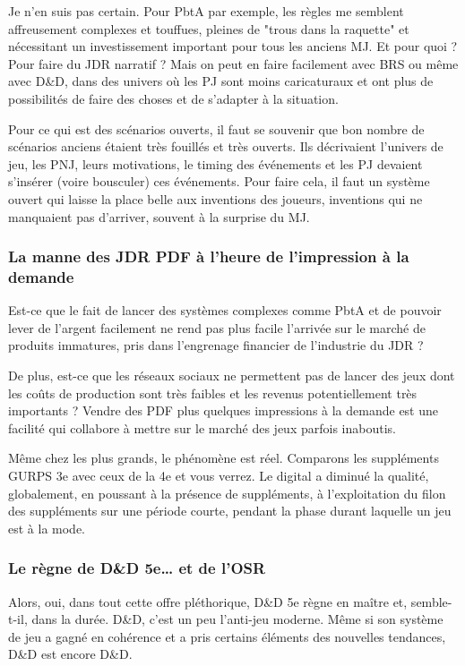 \documentclass[a4paper, 11pt, twoside]{article}
\begin{document}
Je n'en suis pas certain. Pour PbtA par exemple, les règles me semblent affreusement complexes et touffues, pleines de "trous dans la raquette" et nécessitant un investissement important pour tous les anciens MJ. Et pour quoi ? Pour faire du JDR narratif ? Mais on peut en faire facilement avec BRS ou même avec D\&D, dans des univers où les PJ sont moins caricaturaux et ont plus de possibilités de faire des choses et de s'adapter à la situation.

Pour ce qui est des scénarios ouverts, il faut se souvenir que bon nombre de scénarios anciens étaient très fouillés et très ouverts. Ils décrivaient l'univers de jeu, les PNJ, leurs motivations, le timing des événements et les PJ devaient s'insérer (voire bousculer) ces événements. Pour faire cela, il faut un système ouvert qui laisse la place belle aux inventions des joueurs, inventions qui ne manquaient pas d'arriver, souvent à la surprise du MJ.

\subsubsection{La manne des JDR PDF à l'heure de l'impression à la demande}
\label{sec:org9dcc49a}

Est-ce que le fait de lancer des systèmes complexes comme PbtA et de pouvoir lever de l'argent facilement ne rend pas plus facile l'arrivée sur le marché de produits immatures, pris dans l'engrenage financier de l'industrie du JDR ?

De plus, est-ce que les réseaux sociaux ne permettent pas de lancer des jeux dont les coûts de production sont très faibles et les revenus potentiellement très importants ? Vendre des PDF plus quelques impressions à la demande est une facilité qui collabore à mettre sur le marché des jeux parfois inaboutis.

Même chez les plus grands, le phénomène est réel. Comparons les suppléments GURPS 3e avec ceux de la 4e et vous verrez. Le digital a diminué la qualité, globalement, en poussant à la présence de suppléments, à l'exploitation du filon des suppléments sur une période courte, pendant la phase durant laquelle un jeu est à la mode.

\subsubsection{Le règne de D\&D 5e\ldots{} et de l'OSR}
\label{sec:org9e4c5d9}

Alors, oui, dans tout cette offre pléthorique, D\&D 5e règne en maître et, semble-t-il, dans la durée. D\&D, c'est un peu l'anti-jeu moderne. Même si son système de jeu a gagné en cohérence et a pris certains éléments des nouvelles tendances, D\&D est encore D\&D.
\end{document}
